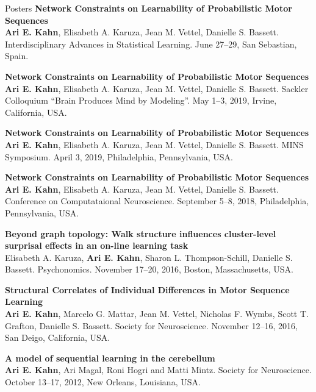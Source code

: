 \documentclass{resume} %
\begin{document}
\begin{rSection}{Posters}
\textbf{Network Constraints on Learnability of Probabilistic Motor Sequences} \\
\textbf{Ari E. Kahn}, Elisabeth A. Karuza, Jean M. Vettel, Danielle S. Bassett.
Interdisciplinary Advances in Statistical Learning. June 27--29, San Sebastian, Spain.

\textbf{Network Constraints on Learnability of Probabilistic Motor Sequences} \\
\textbf{Ari E. Kahn}, Elisabeth A. Karuza, Jean M. Vettel, Danielle S. Bassett.
Sackler Colloquium ``Brain Produces Mind by Modeling''. May 1--3, 2019, Irvine, California, USA.

\textbf{Network Constraints on Learnability of Probabilistic Motor Sequences} \\
\textbf{Ari E. Kahn}, Elisabeth A. Karuza, Jean M. Vettel, Danielle S. Bassett.
MINS Symposium. April 3, 2019, Philadelphia, Pennsylvania, USA.

\textbf{Network Constraints on Learnability of Probabilistic Motor Sequences} \\
\textbf{Ari E. Kahn}, Elisabeth A. Karuza, Jean M. Vettel, Danielle S. Bassett.
Conference on Computataional Neuroscience. September 5--8, 2018, Philadelphia, Pennsylvania, USA.

\textbf{Beyond graph topology: Walk structure influences cluster-level surprisal effects in an on-line learning task} \\
Elisabeth A. Karuza, \textbf{Ari E. Kahn}, Sharon L. Thompson-Schill, Danielle S. Bassett.
Psychonomics. November 17--20, 2016, Boston, Massachusetts, USA.

\textbf{Structural Correlates of Individual Differences in Motor Sequence Learning} \\
\textbf{Ari E. Kahn}, Marcelo G. Mattar, Jean M. Vettel, Nicholas F. Wymbs, Scott T. Grafton, Danielle S. Bassett.
Society for Neuroscience. November 12--16, 2016, San Deigo, California, USA.

\textbf{A model of sequential learning in the cerebellum} \\
\textbf{Ari E. Kahn}, Ari Magal, Roni Hogri and Matti Mintz.
Society for Neuroscience. October 13--17, 2012, New Orleans, Louisiana, USA.
\end{rSection}
\end{document}
